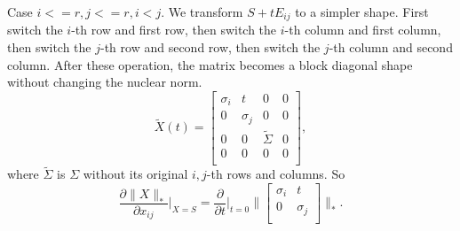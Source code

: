 Case $i<=r,j<=r,i<j$.
We transform $S+tE_{ij}$ to a simpler shape.
First switch the $i$-th row and first row,
then switch the $i$-th column and first column,
then switch the $j$-th row and second row,
then switch the $j$-th column and second column.
After these operation,
the matrix becomes a block diagonal shape without changing the nuclear norm.
\begin{equation}
    \tilde X(t)=\begin{bmatrix}
    \sigma_i & t        & 0            & 0 \\
    0        & \sigma_j & 0            & 0 \\
    0        & 0        & \tilde\Sigma & 0 \\
    0        & 0        & 0            & 0 \\
\end{bmatrix},
\end{equation}
where $\tilde\Sigma$ is $\Sigma$ without its original $i,j$-th rows and columns.
So
\begin{equation}
    \frac{\partial\|X\|_*}{\partial x_{ij}}\bigg|_{X=S}
        =\frac{\partial}{\partial t}\bigg|_{t=0}
            \bigg\|\begin{bmatrix}
                \sigma_i & t        \\
                0        & \sigma_j \\
            \end{bmatrix}\bigg\|_*.
\end{equation}
